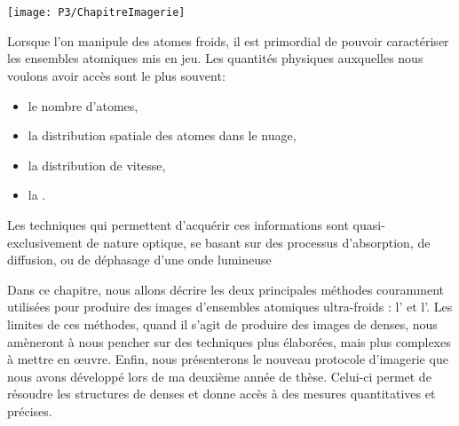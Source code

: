 \chapter{\TitreChapitreSix}\label{chap:Imagerie}

\bfigh
\texttt{[image: P3/ChapitreImagerie]}
\SansCaption
\efigh

\pagebreak

\minitoc
\vspace{0.5cm}

\noindent Lorsque l'on manipule des atomes froids, il est primordial de pouvoir caractériser les ensembles atomiques mis en jeu.
Les quantités physiques auxquelles nous voulons avoir accès sont le plus souvent:
\begin{itemize}
	\item le nombre d'atomes,
	\item la distribution spatiale des atomes dans le nuage,
	\item la distribution de vitesse,
	\item la \ddedpup.
\end{itemize}
Les techniques qui permettent d'acquérir ces informations sont quasi-exclusivement de nature optique, \cad se basant sur des processus d'absorption, de diffusion, ou de déphasage d'une onde lumineuse%
%

Dans ce chapitre, nous allons décrire les deux principales méthodes couramment utilisées pour produire des images d'ensembles atomiques ultra-froids : l'\termetech{\ipf} et l'. Les limites de ces méthodes, quand il s'agit de produire des images de \ns denses, nous amèneront à nous pencher sur des techniques plus élaborées, mais plus complexes à mettre en \oe uvre. 
Enfin, nous présenterons le nouveau protocole d'imagerie que nous avons développé lors de ma deuxième année de thèse. Celui-ci permet de résoudre les structures de \nats denses et donne accès à des mesures quantitatives et précises.


